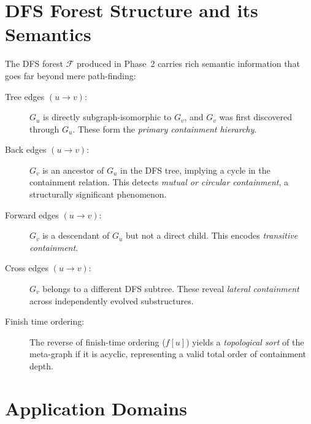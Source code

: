 ﻿\documentclass[12pt,a4paper]{article}
\theoremstyle{plain}
\theoremstyle{definition}
\theoremstyle{remark}
\begin{document}
	\section{DFS Forest Structure and its Semantics}
	\label{sec:forest}
	
	The DFS forest $\mathcal{F}$ produced in Phase~2 carries rich semantic
	information that goes far beyond mere path-finding:
	
	\begin{description}
		\item[Tree edges $(u \to v)$:] $G_u$ is directly subgraph-isomorphic to
		$G_v$, and $G_v$ was first discovered through $G_u$.  These form the
		\emph{primary containment hierarchy}.
		
		\item[Back edges $(u \to v)$:] $G_v$ is an ancestor of $G_u$ in the DFS
		tree, implying a cycle in the containment relation.  This detects
		\emph{mutual or circular containment}, a structurally significant
		phenomenon.
		
		\item[Forward edges $(u \to v)$:] $G_v$ is a descendant of $G_u$ but not a
		direct child.  This encodes \emph{transitive containment}.
		
		\item[Cross edges $(u \to v)$:] $G_v$ belongs to a different DFS subtree.
		These reveal \emph{lateral containment} across independently evolved
		substructures.
		
		\item[Finish time ordering:] The reverse of finish-time ordering ($f[u]$)
		yields a \emph{topological sort} of the meta-graph if it is acyclic,
		representing a valid total order of containment depth.
	\end{description}
	
	\section{Application Domains}
	\label{sec:applications}
	
\end{document}

